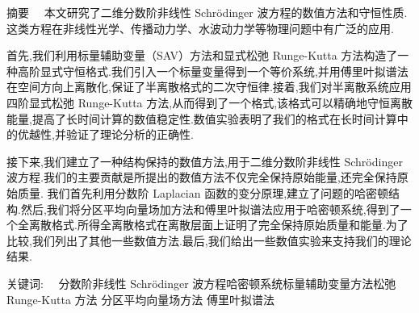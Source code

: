 
\begin{ChineseAbstract}[副教授]%
\item {\heiti 摘要\ \ }
本文研究了二维分数阶非线性 Schr{\"o}dinger 波方程的数值方法和守恒性质.这类方程在非线性光学、传播动力学、水波动力学等物理问题中有广泛的应用.

首先,我们利用标量辅助变量（SAV）方法和显式松弛 Runge-Kutta 方法构造了一种高阶显式守恒格式.我们引入一个标量变量得到一个等价系统,并用傅里叶拟谱法在空间方向上离散化,保证了半离散格式的二次守恒律.接着,我们对半离散系统应用四阶显式松弛 Runge-Kutta 方法,从而得到了一个格式,该格式可以精确地守恒离散能量,提高了长时间计算的数值稳定性.数值实验表明了我们的格式在长时间计算中的优越性,并验证了理论分析的正确性.

接下来,我们建立了一种结构保持的数值方法,用于二维分数阶非线性 Schr{\"o}dinger 波方程.我们的主要贡献是所提出的数值方法不仅完全保持原始能量,还完全保持原始质量.
我们首先利用分数阶 Laplacian 函数的变分原理,建立了问题的哈密顿结构.然后,我们将分区平均向量场加方法和傅里叶拟谱法应用于哈密顿系统,得到了一个全离散格式.所得全离散格式在离散层面上证明了完全保持原始质量和能量.为了比较,我们列出了其他一些数值方法.最后,我们给出一些数值实验来支持我们的理论结果.

\item {\heiti 关键词:\ \ } 分数阶非线性 Schr{\"o}dinger 波方程\qquad 哈密顿系统\qquad 标量辅助变量方法\qquad 松弛 Runge-Kutta 方法 \qquad 分区平均向量场方法 \qquad 傅里叶拟谱法
\end{ChineseAbstract}
